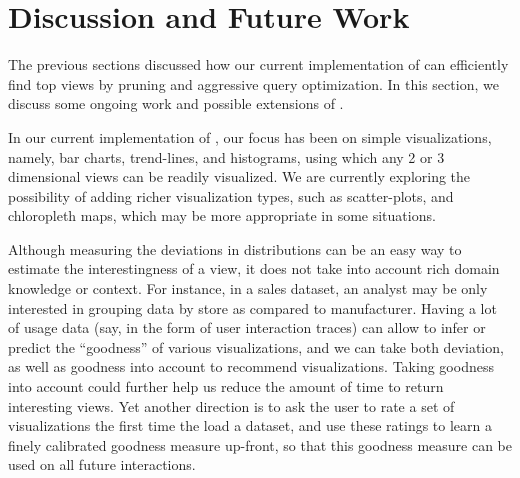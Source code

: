 

\section{Discussion and Future Work}
\label{sec:discussion}
The previous sections discussed how our current implementation of \SeeDB can
efficiently find top views by pruning and aggressive query optimization.
In this section, we discuss some ongoing work and possible extensions of
\SeeDB.

 In our current implementation
of \SeeDB, our focus has been on simple visualizations, namely, bar charts, trend-lines,
and histograms, using which any 2 or 3 dimensional views can be readily visualized.
We are currently exploring the possibility of adding richer visualization types,
such as scatter-plots, and chloropleth maps, which may be more appropriate
in some situations. 

 Although measuring the 
deviations in distributions can be an easy way to estimate the interestingness of a 
view, it does not take into account rich domain knowledge or context.
For instance, in a sales dataset, an analyst may be only interested in grouping
data by store as compared to manufacturer. 
Having a lot of usage data (say, in the form of user interaction traces)
can allow \SeeDB to infer or predict the ``goodness''
of various visualizations, and we can take both deviation, as well as 
goodness into account to recommend visualizations. 
Taking goodness into account could further help us reduce the amount of time
to return interesting views.
Yet another direction is to ask the user to rate a set of visualizations
the first time the load a dataset, and use these ratings to 
learn a finely calibrated goodness measure up-front,
so that this goodness measure can be used on all future interactions.

 


